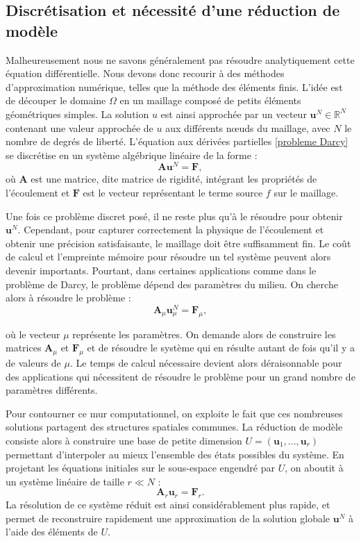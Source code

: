 \documentclass[12pt,a4paper]{article}
\begin{document}
\subsection{Discrétisation et nécessité d'une réduction de modèle}

Malheureusement nous ne savons généralement pas résoudre analytiquement 
cette équation différentielle. Nous devons donc recourir à des méthodes d'approximation 
numérique, telles que la méthode des éléments finis. L'idée est de découper le 
domaine $\Omega$ en un maillage composé de petits éléments géométriques simples. 
La solution $u$ est ainsi approchée par un vecteur 
$\mathbf{u}^N \in \mathbb{R}^N$ contenant une valeur approchée de $u$ aux différents nœuds du maillage, avec $N$ le nombre de degrés de liberté. L'équation aux dérivées partielles \eqref{probleme Darcy} se discrétise en un système algébrique linéaire de la forme :
\begin{equation*}
  \mathbf{A} \mathbf{u}^N = \mathbf{F},
\end{equation*}
où $\mathbf{A}$ est une matrice, dite matrice de rigidité, intégrant les propriétés de l'écoulement et $\mathbf{F}$ est le vecteur représentant le terme source $f$ sur le maillage. 

Une fois ce problème discret posé, il ne reste plus qu'à le résoudre pour obtenir $\mathbf{u}^N$. Cependant, pour capturer correctement la physique de 
l'écoulement et obtenir une précision satisfaisante, le maillage doit être suffisamment fin. Le coût de calcul et l'empreinte mémoire pour résoudre un tel système peuvent alors  
devenir importants. Pourtant, dans certaines applications 
comme dans le problème de Darcy, le problème dépend des paramètres du milieu. On cherche alors à résoudre le problème :
\begin{equation*}
  \mathbf{A}_\mu \mathbf{u}^N_\mu = \mathbf{F}_\mu,
\end{equation*}

où le vecteur $\mu$ représente les paramètres. On demande alors de construire les matrices $\mathbf{A}_\mu$
et $\mathbf{F}_\mu$ et de résoudre le système qui en résulte autant de fois qu'il y a 
de valeurs de $\mu$. Le temps de calcul nécessaire devient alors déraisonnable pour des applications
qui nécessitent de résoudre le problème pour un grand nombre de paramètres différents.

Pour contourner ce mur computationnel, on exploite le fait que ces nombreuses solutions 
partagent des structures spatiales communes. La réduction de modèle consiste alors à construire une base de petite dimension $U=(\mathbf{u}_1, ..., \mathbf{u}_r)$ 
permettant d'interpoler au mieux l'ensemble des états possibles du système. 
En projetant les équations initiales sur le sous-espace engendré par $U$, 
on aboutit à un système linéaire de taille $r \ll N$ :
\begin{equation*}
    \mathbf{A}_r \mathbf{u}_r = \mathbf{F}_r.
\end{equation*}
La résolution de ce système réduit est ainsi considérablement plus rapide, et permet de reconstruire rapidement une approximation de la solution globale $\mathbf{u}^N$ à l'aide des éléments de $U$.
\end{document}

